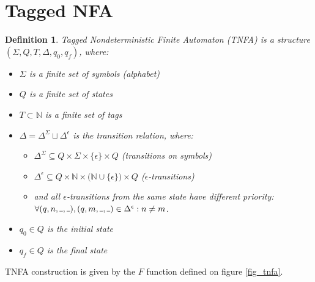 \documentclass[AMA,STIX1COL]{WileyNJD-v2}
\newcommand{\Xund}{\rule{.4em}{.4pt}}
\newcommand{\YN}{\mathbb{N}}
\newtheorem{Xdef}{Definition}
\begin{document}
\FloatBarrier


\section{Tagged NFA}

    \begin{Xdef}
    \emph{Tagged Nondeterministic Finite Automaton (TNFA)}
    is a structure $(\Sigma, Q, T, \Delta, q_0, q_f)$, where:
    \begin{itemize}
        \item[] $\Sigma$ is a finite set of symbols (\emph{alphabet})
        \item[] $Q$ is a finite set of \emph{states}
        \item[] $T\subset\YN$ is a finite set of \emph{tags}
        \item[] $\Delta = \Delta^\Sigma \sqcup \Delta^\epsilon$ is the \emph{transition} relation, where:
        \begin{itemize}
            \item[] $\Delta^\Sigma \subseteq Q \times \Sigma \times \{\epsilon\} \times Q$ (transitions on symbols)
            \item[] $\Delta^\epsilon \subseteq Q \times \YN \times \big( \YN \cup \{\epsilon\} \big) \times Q$ ($\epsilon$-transitions)
            \item[]
                and all $\epsilon$-transitions from the same state have different priority:
                $\forall (q, n, \Xund, \Xund), (q, m, \Xund, \Xund) \in \Delta^\epsilon: n \neq m$.
        \end{itemize}
        \item[] $q_0 \in Q$ is the \emph{initial} state
        \item[] $q_f \in Q$ is the \emph{final} state
    \end{itemize}
    \end{Xdef}

TNFA construction is given by the $F$ function defined on figure \ref{fig_tnfa}.
\end{document}
